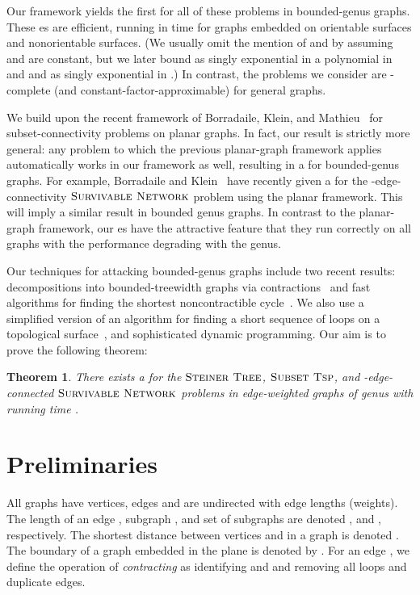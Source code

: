 \documentclass{article}
\newtheorem{theorem}{Theorem}
\newcommand{\myproblemname}[1]{\ensuremath{\mbox{\sc #1}}\xspace}
\newcommand{\steiner}{\myproblemname{Steiner Tree}}
\newcommand{\subtsp}{\myproblemname{Subset Tsp}}
\newcommand{\survive}{\myproblemname{Survivable Network}}
\begin{document}
Our framework yields the first  for all of these problems in
bounded-genus graphs.  These es are efficient, running in
 time for graphs embedded on orientable surfaces and
nonorientable surfaces.  (We usually omit the mention of
 and  by assuming  and  are
constant, but we later bound  as singly exponential in
a polynomial in~ and  and  as singly exponential
in .)  In contrast, the problems we consider are -complete
(and constant-factor-approximable) for general graphs.

We build upon the recent  framework of Borradaile, Klein, and
Mathieu~\cite{BorradaileKM09} for subset-connectivity problems on
planar graphs.  In fact, our result is strictly more general: any
problem to which the previous planar-graph framework applies
automatically works in our framework as well, resulting in a  for
bounded-genus graphs.  For example, Borradaile and
Klein~\cite{BorradaileKlein08} have recently given a  for the
-edge-connectivity \survive problem
using the planar framework.  This will imply a similar result in
bounded genus graphs.  In contrast to the planar-graph framework, our
es have the attractive feature that they run correctly on all
graphs with the performance degrading with the genus.

Our techniques for attacking bounded-genus graphs include two recent
results: decompositions into bounded-treewidth graphs via
contractions~\cite{DemaineHM07} and fast algorithms for finding the
shortest noncontractible cycle~\cite{CabelloChambers07}.  We also use
a simplified version of an algorithm for finding a short sequence of
loops on a topological surface~\cite{EricksonWhittlesey05}, and
sophisticated dynamic programming. Our aim is to prove the following theorem:

\begin{theorem}\label{thm:main_ptas} 
  There exists a  for the \steiner, \subtsp, and
  -edge-connected \survive problems in edge-weighted graphs of
  genus  with running time .
\end{theorem}




\section{Preliminaries}

All graphs  have  vertices,  edges and are undirected
with edge lengths (weights).  The length of an edge , subgraph , and set
of subgraphs  are denoted ,  and
, respectively.  The shortest distance between
vertices  and  in a graph  is denoted .  The
boundary of a graph  embedded in the plane is denoted by . For an edge , we define the operation of \emph{contracting}
 as identifying  and  and removing all loops and duplicate edges.
\end{document}
